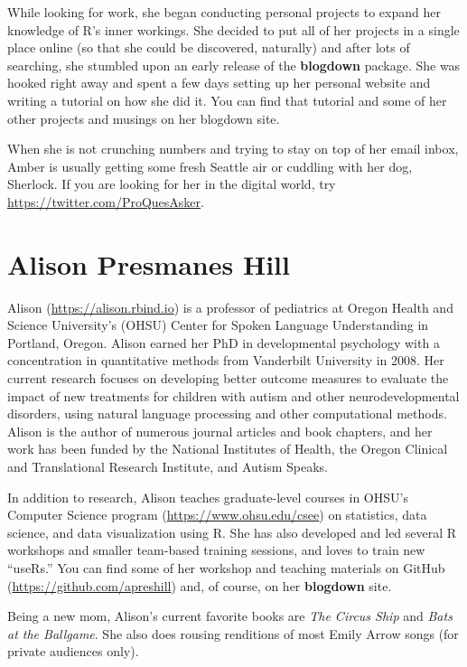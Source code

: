 \documentclass[12pt,]{krantz}
\theoremstyle{definition}
\theoremstyle{definition}
\theoremstyle{definition}
\theoremstyle{remark}
\begin{document}
While looking for work, she began conducting personal projects to expand
her knowledge of R's inner workings. She decided to put all of her
projects in a single place online (so that she could be discovered,
naturally) and after lots of searching, she stumbled upon an early
release of the \textbf{blogdown} package. She was hooked right away and
spent a few days setting up her personal website and writing a tutorial
on how she did it. You can find that tutorial and some of her other
projects and musings on her blogdown site.

When she is not crunching numbers and trying to stay on top of her email
inbox, Amber is usually getting some fresh Seattle air or cuddling with
her dog, Sherlock. If you are looking for her in the digital world, try
\url{https://twitter.com/ProQuesAsker}.

\hypertarget{alison-presmanes-hill}{%
\section*{Alison Presmanes Hill}\label{alison-presmanes-hill}}


Alison (\url{https://alison.rbind.io}) is a professor of pediatrics at
Oregon Health and Science University's (OHSU) Center for Spoken Language
Understanding in Portland, Oregon. Alison earned her PhD in
developmental psychology with a concentration in quantitative methods
from Vanderbilt University in 2008. Her current research focuses on
developing better outcome measures to evaluate the impact of new
treatments for children with autism and other neurodevelopmental
disorders, using natural language processing and other computational
methods. Alison is the author of numerous journal articles and book
chapters, and her work has been funded by the National Institutes of
Health, the Oregon Clinical and Translational Research Institute, and
Autism Speaks.

In addition to research, Alison teaches graduate-level courses in OHSU's
Computer Science program (\url{https://www.ohsu.edu/csee}) on
statistics, data science, and data visualization using R. She has also
developed and led several R workshops and smaller team-based training
sessions, and loves to train new ``useRs.'' You can find some of her
workshop and teaching materials on GitHub
(\url{https://github.com/apreshill}) and, of course, on her
\textbf{blogdown} site.

Being a new mom, Alison's current favorite books are \emph{The Circus
Ship} and \emph{Bats at the Ballgame}. She also does rousing renditions
of most Emily Arrow songs (for private audiences only).
\end{document}
